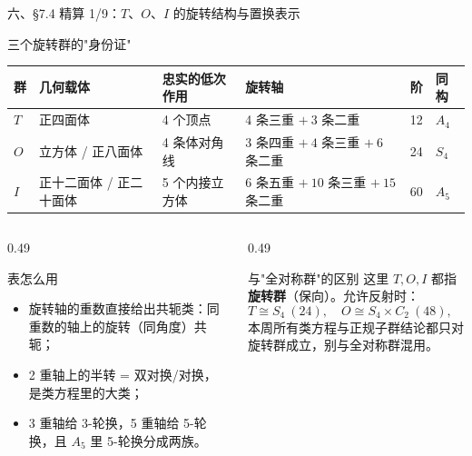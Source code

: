 \documentclass[aspectratio=169,10pt,fontset=none]{ctexbeamer}
\begin{document}
\begin{frame}[t]{六、\S7.4 精算 1/9：$T$、$O$、$I$ 的旋转结构与置换表示}
  \centering
  \begin{block}{\footnotesize 三个旋转群的"身份证"}
    \scriptsize
    \renewcommand{\arraystretch}{1.3}
    \begin{tabular}{@{}l l l l c l@{}}
      \toprule
      群 & 几何载体 & 忠实的低次作用 & 旋转轴 & 阶 & 同构\\
      \midrule
      $T$ & 正四面体 & 4 个顶点 & 4 条三重 $+\ 3$ 条二重 & 12 & $A_4$\\
      $O$ & 立方体 / 正八面体 & 4 条体对角线 & 3 条四重 $+\ 4$ 条三重 $+\ 6$ 条二重 & 24 & $S_4$\\
      $I$ & 正十二面体 / 正二十面体 & 5 个内接立方体 & 6 条五重 $+\ 10$ 条三重 $+\ 15$ 条二重 & 60 & $A_5$\\
      \bottomrule
    \end{tabular}
  \end{block}
  \raggedright
  \begin{columns}[T,onlytextwidth]
    \begin{column}{0.49\textwidth}
      \begin{block}{\footnotesize 表怎么用}
        \scriptsize
        \begin{itemize}\setlength{\itemsep}{1pt}
          \item 旋转轴的重数直接给出共轭类：同重数的轴上的旋转（同角度）共轭；
          \item 2 重轴上的半转 = 双对换/对换，是类方程里的大类；
          \item 3 重轴给 3-轮换，5 重轴给 5-轮换，且 $A_5$ 里 5-轮换分成两族。
        \end{itemize}
      \end{block}
    \end{column}
    \begin{column}{0.49\textwidth}
      \begin{exampleblock}{\footnotesize 与"全对称群"的区别}
        \scriptsize
        这里 $T,O,I$ 都指\textbf{旋转群}（保向）。允许反射时：
        \[ T\cong S_4\ (24),\quad O\cong S_4\times C_2\ (48),\quad I\cong A_5\times C_2\ (120). \]
        本周所有类方程与正规子群结论都只对旋转群成立，别与全对称群混用。
      \end{exampleblock}
    \end{column}
  \end{columns}
\end{frame}
\end{document}

